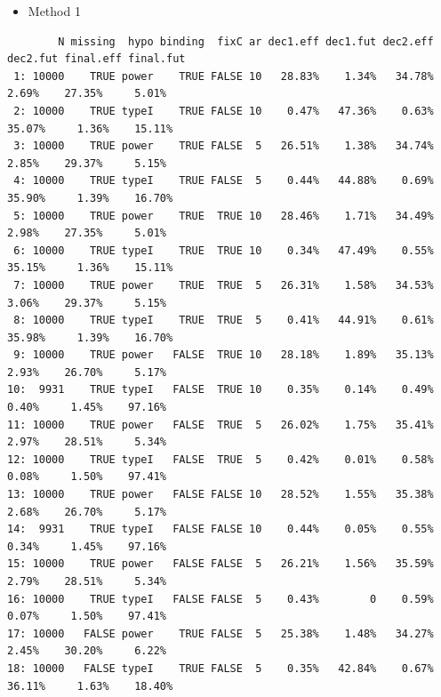 \documentclass[12pt]{article}
\begin{document}
\begin{itemize}
\item Method 1
\end{itemize}
\begin{verbatim}
        N missing  hypo binding  fixC ar dec1.eff dec1.fut dec2.eff dec2.fut final.eff final.fut
 1: 10000    TRUE power    TRUE FALSE 10   28.83%    1.34%   34.78%    2.69%    27.35%     5.01%
 2: 10000    TRUE typeI    TRUE FALSE 10    0.47%   47.36%    0.63%   35.07%     1.36%    15.11%
 3: 10000    TRUE power    TRUE FALSE  5   26.51%    1.38%   34.74%    2.85%    29.37%     5.15%
 4: 10000    TRUE typeI    TRUE FALSE  5    0.44%   44.88%    0.69%   35.90%     1.39%    16.70%
 5: 10000    TRUE power    TRUE  TRUE 10   28.46%    1.71%   34.49%    2.98%    27.35%     5.01%
 6: 10000    TRUE typeI    TRUE  TRUE 10    0.34%   47.49%    0.55%   35.15%     1.36%    15.11%
 7: 10000    TRUE power    TRUE  TRUE  5   26.31%    1.58%   34.53%    3.06%    29.37%     5.15%
 8: 10000    TRUE typeI    TRUE  TRUE  5    0.41%   44.91%    0.61%   35.98%     1.39%    16.70%
 9: 10000    TRUE power   FALSE  TRUE 10   28.18%    1.89%   35.13%    2.93%    26.70%     5.17%
10:  9931    TRUE typeI   FALSE  TRUE 10    0.35%    0.14%    0.49%    0.40%     1.45%    97.16%
11: 10000    TRUE power   FALSE  TRUE  5   26.02%    1.75%   35.41%    2.97%    28.51%     5.34%
12: 10000    TRUE typeI   FALSE  TRUE  5    0.42%    0.01%    0.58%    0.08%     1.50%    97.41%
13: 10000    TRUE power   FALSE FALSE 10   28.52%    1.55%   35.38%    2.68%    26.70%     5.17%
14:  9931    TRUE typeI   FALSE FALSE 10    0.44%    0.05%    0.55%    0.34%     1.45%    97.16%
15: 10000    TRUE power   FALSE FALSE  5   26.21%    1.56%   35.59%    2.79%    28.51%     5.34%
16: 10000    TRUE typeI   FALSE FALSE  5    0.43%        0    0.59%    0.07%     1.50%    97.41%
17: 10000   FALSE power    TRUE FALSE  5   25.38%    1.48%   34.27%    2.45%    30.20%     6.22%
18: 10000   FALSE typeI    TRUE FALSE  5    0.35%   42.84%    0.67%   36.11%     1.63%    18.40%
\end{verbatim}
\end{document}
